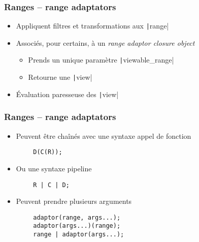 \documentclass[C++.tex]{subfiles}
\begin{document}
\begin{frame}[fragile]
	\frametitle{Ranges -- range adaptators}
	\begin{itemize}
		\item Appliquent filtres et transformations aux \texttt|range|
		\item Associés, pour certains, à un \textit{range adaptor closure object}
		\begin{itemize}
			\item Prends un unique paramètre \texttt|viewable_range|
			\item Retourne une \texttt|view|
		\end{itemize}
		\item Évaluation paresseuse des \texttt|view|
	\end{itemize}
\end{frame}

\begin{frame}[fragile]
	\frametitle{Ranges -- range adaptators}
	\begin{itemize}
		\item Peuvent être chaînés avec une syntaxe \og appel de fonction\fg{}
	\end{itemize}

	\begin{verbatim}
		D(C(R));
	\end{verbatim}

	\begin{itemize}
		\item Ou une syntaxe \og pipeline\fg{}
	\end{itemize}

	\begin{verbatim}
		R | C | D;
	\end{verbatim}

	\begin{itemize}
		\item Peuvent prendre plusieurs arguments

	\end{itemize}

	\begin{verbatim}
		adaptor(range, args...);
		adaptor(args...)(range);
		range | adaptor(args...);
	\end{verbatim}

\end{frame}
\end{document}
